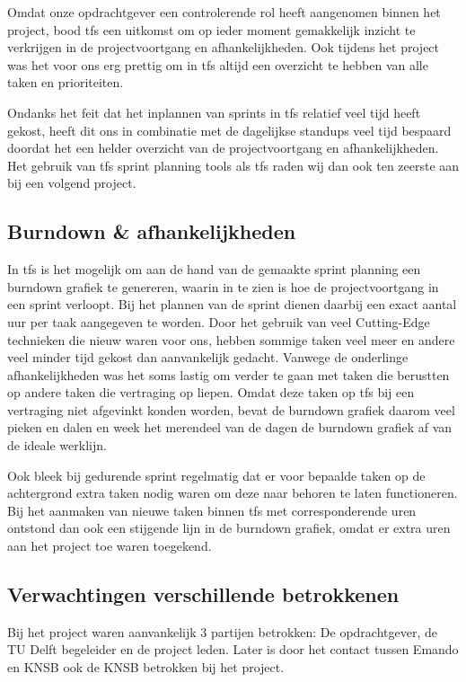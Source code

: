 Omdat onze opdrachtgever een controlerende rol heeft aangenomen binnen het project, bood \ac{tfs} een uitkomst om op ieder moment gemakkelijk inzicht te verkrijgen in de projectvoortgang en afhankelijkheden. Ook tijdens het project was het voor ons erg prettig om in \ac{tfs} altijd een overzicht te hebben van alle taken en prioriteiten. 

Ondanks het feit dat het inplannen van sprints in \ac{tfs} relatief veel tijd heeft gekost, heeft dit ons in combinatie met de dagelijkse standups veel tijd bespaard doordat het een helder overzicht van de projectvoortgang en afhankelijkheden. Het gebruik van \ac{tfs} sprint planning tools als \ac{tfs} raden wij dan ook ten zeerste aan bij een volgend project.

\subsection{Burndown \& afhankelijkheden}
In \ac{tfs} is het mogelijk om aan de hand van de gemaakte sprint planning een burndown grafiek te genereren, waarin in te zien is hoe de projectvoortgang in een sprint verloopt. Bij het plannen van de sprint dienen daarbij een exact aantal uur per taak aangegeven te worden. Door het gebruik van veel Cutting-Edge technieken die nieuw waren voor ons, hebben sommige taken veel meer en andere veel minder tijd gekost dan aanvankelijk gedacht. Vanwege de onderlinge afhankelijkheden was het soms lastig om verder te gaan met taken die berustten op andere taken die vertraging op liepen. Omdat deze taken op \ac{tfs} bij een vertraging niet afgevinkt konden worden, bevat de burndown grafiek daarom veel pieken en dalen en week het merendeel van de dagen de burndown grafiek af van de ideale werklijn. 

Ook bleek bij gedurende sprint regelmatig dat er voor bepaalde taken op de achtergrond extra taken nodig waren om deze naar behoren te laten functioneren. Bij het aanmaken van nieuwe taken binnen \ac{tfs} met corresponderende uren ontstond dan ook een stijgende lijn in de burndown grafiek, omdat er extra uren aan het project toe waren toegekend.


\subsection{Verwachtingen verschillende betrokkenen}
Bij het project waren aanvankelijk 3 partijen betrokken: De opdrachtgever, de TU Delft begeleider en de project leden.
Later is door het contact tussen Emando en KNSB ook de KNSB betrokken bij het project. 

